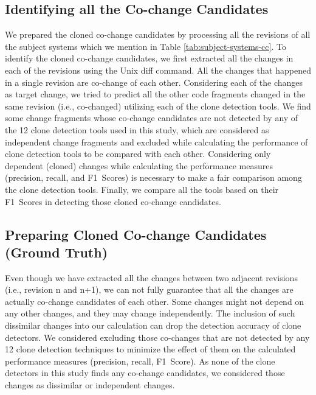 \documentclass[review]{elsarticle}
\begin{document}
\subsection{Identifying all the Co-change Candidates}
We prepared the cloned co-change candidates by processing all the revisions of all the subject systems which we mention in Table \ref{tab:subject-systems-cc}. To identify the cloned co-change candidates, we first extracted all the changes in each of the revisions using the Unix diff command. All the changes that happened in a single revision are co-change of each other. Considering each of the changes as target change, we tried to predict all the other code fragments changed in the same revision (i.e., co-changed) utilizing each of the clone detection tools. We find some change fragments whose co-change candidates are not detected by any of the 12 clone detection tools used in this study, which are considered as independent change fragments and excluded while calculating the performance of clone detection tools to be compared with each other. Considering only dependent (cloned) changes while calculating the performance measures (precision, recall, and F1~Scores) is necessary to make a fair comparison among the clone detection tools. Finally, we compare all the tools based on their F1~Scores in detecting those cloned co-change candidates.

\subsection{Preparing Cloned Co-change Candidates (Ground Truth)} 
Even though we have extracted all the changes between two adjacent revisions (i.e., revision n and n+1), we can not fully guarantee that all the changes are actually co-change candidates of each other. Some changes might not depend on any other changes, and they may change independently. The inclusion of such dissimilar changes into our calculation can drop the detection accuracy of clone detectors. We considered excluding those co-changes that are not detected by any 12 clone detection techniques to minimize the effect of them on the calculated performance measures (precision, recall, F1~Score). As none of the clone detectors in this study finds any co-change candidates, we considered those changes as dissimilar or independent changes. 
\end{document}

